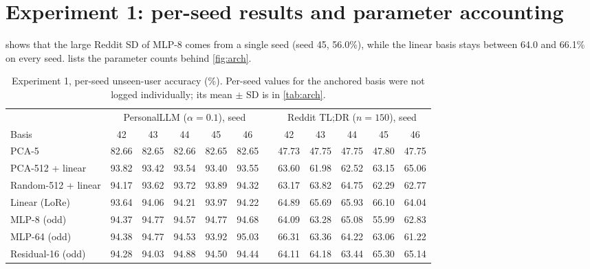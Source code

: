 \documentclass[11pt,a4paper]{article}
\begin{document}
\clearpage

\section{Experiment 1: per-seed results and parameter accounting}
\label{app:arch}
 shows that the large Reddit SD of MLP-8 comes from a single seed (seed 45, 56.0\%),
while the linear basis stays between 64.0 and 66.1\% on every seed.  lists the parameter
counts behind \cref{fig:arch}.

\begin{table}[ht]
\centering\small
\caption{Experiment 1, per-seed unseen-user accuracy (\%). Per-seed values for the anchored basis were not
logged individually; its mean $\pm$ SD is in \cref{tab:arch}.}
\label{tab:arch-seeds}
\begin{tabular}{@{}l ccccc c ccccc@{}}
\toprule
& \multicolumn{5}{c}{PersonalLLM ($\alpha=0.1$), seed} && \multicolumn{5}{c}{Reddit TL;DR ($n=150$), seed}\\
\cmidrule{2-6}\cmidrule{8-12}
Basis & 42 & 43 & 44 & 45 & 46 && 42 & 43 & 44 & 45 & 46\\
\midrule
PCA-5 & 82.66 & 82.65 & 82.66 & 82.65 & 82.65 &  & 47.73 & 47.75 & 47.75 & 47.80 & 47.75\\
PCA-512 + linear & 93.82 & 93.42 & 93.54 & 93.40 & 93.55 &  & 63.60 & 61.98 & 62.52 & 63.15 & 65.06\\
Random-512 + linear & 94.17 & 93.62 & 93.72 & 93.89 & 94.32 &  & 63.17 & 63.82 & 64.75 & 62.29 & 62.77\\
Linear (LoRe) & 93.64 & 94.06 & 94.21 & 93.97 & 94.22 &  & 64.89 & 65.69 & 65.93 & 66.10 & 64.04\\
MLP-8 (odd) & 94.37 & 94.77 & 94.57 & 94.77 & 94.68 &  & 64.09 & 63.28 & 65.08 & 55.99 & 62.83\\
MLP-64 (odd) & 94.38 & 94.77 & 94.53 & 93.92 & 95.03 &  & 66.31 & 63.36 & 64.22 & 63.06 & 61.22\\
Residual-16 (odd) & 94.28 & 94.03 & 94.88 & 94.50 & 94.44 &  & 64.11 & 64.18 & 63.44 & 65.30 & 65.14\\
\bottomrule
\end{tabular}
\end{table}
\end{document}
